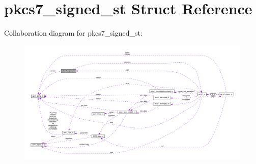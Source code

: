 \hypertarget{structpkcs7__signed__st}{}\section{pkcs7\+\_\+signed\+\_\+st Struct Reference}
\label{structpkcs7__signed__st}


Collaboration diagram for pkcs7\+\_\+signed\+\_\+st\+:
\nopagebreak
\begin{figure}[H]
\begin{center}
\leavevmode
\includegraphics[width=350pt]{structpkcs7__signed__st__coll__graph}
\end{center}
\end{figure}

